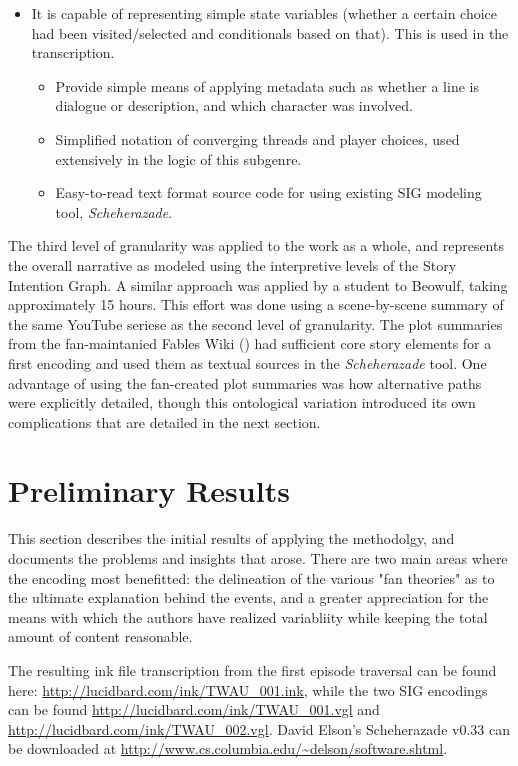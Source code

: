 \begin{itemize}
\item It is capable of representing simple state variables (whether a
certain choice had been visited/selected and conditionals based on
that). This is used in the transcription.
\begin{itemize}
\item Provide simple means of applying metadata such as whether a line is
dialogue or description, and which character was involved.
\item Simplified notation of converging threads and player choices, used
extensively in the logic of this subgenre.
\item Easy-to-read text format source code for using existing SIG
modeling tool, \emph{Scheherazade}.
\end{itemize}
\end{itemize}

The third level of granularity was applied to the work as a whole, and
represents the overall narrative as modeled using the interpretive
levels of the Story Intention Graph. A similar approach was applied by
a student to Beowulf, taking approximately 15 hours. This effort was
done using a scene-by-scene summary of the same YouTube seriese as the
second level of granularity. The plot summaries from the
fan-maintanied Fables Wiki (\cite{fableswiki}) had sufficient core
story elements for a first encoding and used them as textual sources
in the \emph{Scheherazade} tool. One advantage of using the fan-created plot
summaries was how alternative paths were explicitly detailed, though
this ontological variation introduced its own complications that are
detailed in the next section.


\section{Preliminary Results}
\label{sec:orgheadline13}
This section describes the initial results of applying the methodolgy,
and documents the problems and insights that arose. There are two main
areas where the encoding most benefitted: the delineation of the
various "fan theories" as to the ultimate explanation behind the
events, and a greater appreciation for the means with which the
authors have realized variabliity while keeping the total amount of
content reasonable.

The resulting ink file transcription from the first episode traversal
can be found here: \url{http://lucidbard.com/ink/TWAU_001.ink}, while the
two SIG encodings can be found \url{http://lucidbard.com/ink/TWAU_001.vgl}
and \url{http://lucidbard.com/ink/TWAU_002.vgl}. David Elson's Scheherazade
v0.33 can be downloaded at
\url{http://www.cs.columbia.edu/~delson/software.shtml}.

